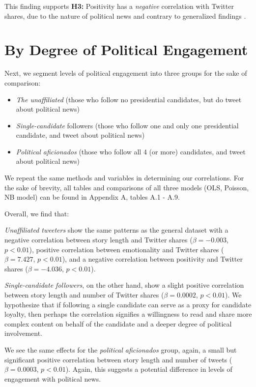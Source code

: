 This finding supports \textbf{H3:} Positivity has a \emph{negative} correlation with Twitter shares, due to the nature of political news and contrary to generalized findings \cite{berger2012makes}.
\newpage



\section{By Degree of Political Engagement}

Next, we segment levels of political engagement into three groups for the sake of comparison:

\begin{itemize}
  \item \emph{The unaffiliated} (those who follow no presidential candidates, but do tweet about political news)
  \item \emph{Single-candidate} followers (those who follow one and only one presidential candidate, and tweet about political news)
  \item \emph{Political aficionados} (those who follow all 4 (or more) candidates, and tweet about political news)
\end{itemize}

We repeat the same methods and variables in determining our correlations. For the sake of brevity, all tables and comparisons of all three models (OLS, Poisson, NB model) can be found in Appendix A, tables A.1 - A.9.

Overall, we find that: 

\emph{Unaffiliated tweeters} show the same patterns as the general dataset with a negative correlation between story length and Twitter shares ($\beta=-0.003$, $p<0.01$), positive correlation between emotionality and Twitter shares ($\beta=7.427$, $p<0.01$), and a negative correlation between positivity and Twitter shares ($\beta=-4.036$, $p<0.01$).

\emph{Single-candidate followers}, on the other hand, show a slight positive correlation between story length and number of Twitter shares ($\beta=0.0002$, $p<0.01$). We hypothesize that if following a single candidate can serve as a proxy for candidate loyalty, then perhaps the correlation signifies a willingness to read and share more complex content on behalf of the candidate and a deeper degree of political involvement.

We see the same effects for the \emph{political aficionados} group, again, a small but significant positive correlation between story length and number of tweets ($\beta=0.0003$, $p<0.01$). Again, this suggests a potential difference in levels of engagement with political news.


